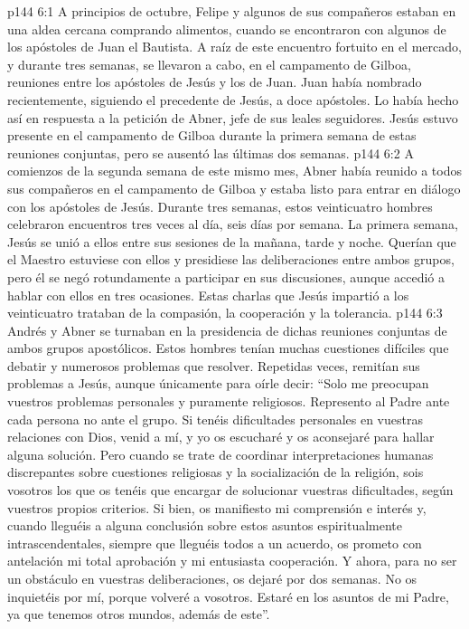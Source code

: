 \vs p144 6:1 A principios de octubre, Felipe y algunos de sus compañeros estaban en una aldea cercana comprando alimentos, cuando se encontraron con algunos de los apóstoles de Juan el Bautista. A raíz de este encuentro fortuito en el mercado, y durante tres semanas, se llevaron a cabo, en el campamento de Gilboa, reuniones entre los apóstoles de Jesús y los de Juan. Juan había nombrado recientemente, siguiendo el precedente de Jesús, a doce apóstoles. Lo había hecho así en respuesta a la petición de Abner, jefe de sus leales seguidores. Jesús estuvo presente en el campamento de Gilboa durante la primera semana de estas reuniones conjuntas, pero se ausentó las últimas dos semanas.
\vs p144 6:2 A comienzos de la segunda semana de este mismo mes, Abner había reunido a todos sus compañeros en el campamento de Gilboa y estaba listo para entrar en diálogo con los apóstoles de Jesús. Durante tres semanas, estos veinticuatro hombres celebraron encuentros tres veces al día, seis días por semana. La primera semana, Jesús se unió a ellos entre sus sesiones de la mañana, tarde y noche. Querían que el Maestro estuviese con ellos y presidiese las deliberaciones entre ambos grupos, pero él se negó rotundamente a participar en sus discusiones, aunque accedió a hablar con ellos en tres ocasiones. Estas charlas que Jesús impartió a los veinticuatro trataban de la compasión, la cooperación y la tolerancia.
\vs p144 6:3 Andrés y Abner se turnaban en la presidencia de dichas reuniones conjuntas de ambos grupos apostólicos. Estos hombres tenían muchas cuestiones difíciles que debatir y numerosos problemas que resolver. Repetidas veces, remitían sus problemas a Jesús, aunque únicamente para oírle decir: “Solo me preocupan vuestros problemas personales y puramente religiosos. Represento al Padre ante cada persona  no ante el grupo. Si tenéis dificultades personales en vuestras relaciones con Dios, venid a mí, y yo os escucharé y os aconsejaré para hallar alguna solución. Pero cuando se trate de coordinar interpretaciones humanas discrepantes sobre cuestiones religiosas y la socialización de la religión, sois vosotros los que os tenéis que encargar de solucionar vuestras dificultades, según vuestros propios criterios. Si bien, os manifiesto mi comprensión e interés y, cuando lleguéis a alguna conclusión sobre estos asuntos espiritualmente intrascendentales, siempre que lleguéis todos a un acuerdo, os prometo con antelación mi total aprobación y mi entusiasta cooperación. Y ahora, para no ser un obstáculo en vuestras deliberaciones, os dejaré por dos semanas. No os inquietéis por mí, porque volveré a vosotros. Estaré en los asuntos de mi Padre, ya que tenemos otros mundos, además de este”.
